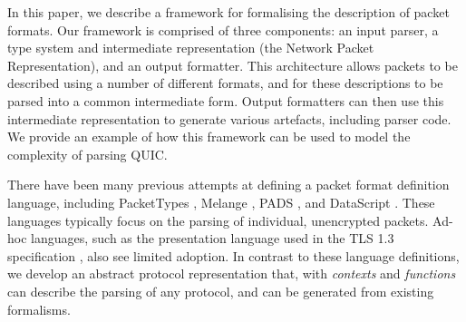 \documentclass[10pt,sigconf]{acmart}
\begin{document}

In this paper, we describe a framework for formalising the description of packet formats.
Our framework is comprised of three components: an input parser, a type system and intermediate
representation (the Network Packet Representation), and an output formatter. This
architecture allows packets to be described using a number of different formats, and for
these descriptions to be parsed into a common intermediate form. Output formatters can then
use this intermediate representation to generate various artefacts, including parser code.
We provide an example of how this framework can be used to model the complexity of parsing
QUIC.


There have been many previous attempts at defining a packet format definition language,
including PacketTypes \cite{mccann2000packet}, Melange \cite{madhavapeddy2007melange},
PADS \cite{fisher2005pads}, and DataScript \cite{back2002datascript}. These languages
typically focus on the parsing of individual, unencrypted packets. Ad-hoc languages, such
as the presentation language used in the TLS 1.3 specification
\cite{draft-ietf-tls-tls13-28}, also see limited adoption. In contrast to these language
definitions, we develop an abstract protocol representation that, with
\emph{contexts} and \emph{functions} can describe the parsing of any protocol, and can be
generated from existing formalisms.

\end{document}

